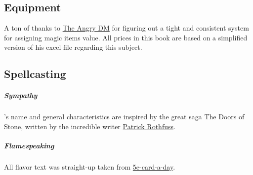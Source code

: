 \subsection*{Equipment}
    A ton of thanks to \href{https://theangrygm.com/how-to-describe-an-item/}{The Angry DM} for figuring out a tight and consistent system for assigning magic items value.
    All prices in this book are based on a simplified version of his excel file regarding this subject.

\subsection*{Spellcasting}
    \subparagraph{Sympathy}'s name and general characteristics are inspired by the great saga The Doors of Stone, written by the incredible writer \href{www.patrickrothfuss.com}{Patrick Rothfuss}.

    \subparagraph{Flamespeaking} All flavor text was straight-up taken from \href{https://5ecardaday.tumblr.com/post/613414046938628096/flamespeaker-adept-if-youd-like-to-support-what}{5e-card-a-day}.

